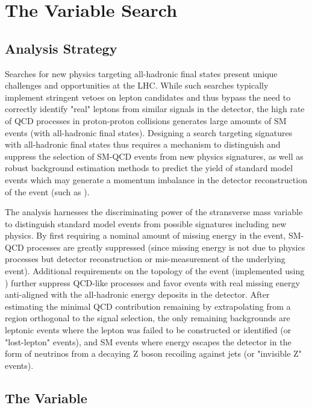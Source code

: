 \chapter{The \mttwo Variable Search}
\label{ch:analysis}

\section{Analysis Strategy}
\label{sec:strategy}
Searches for new physics targeting all-hadronic final states present unique challenges and opportunities at the LHC. While such searches typically implement stringent vetoes on lepton candidates and thus bypass the need to correctly identify "real" leptons from similar signals in the detector, the high rate of QCD processes in proton-proton collisions generates large amounts of SM events (with all-hadronic final states). Designing a search targeting signatures with all-hadronic final states thus requires a mechanism to distinguish and suppress the selection of SM-QCD events from new physics signatures, as well as robust background estimation methods to predict the yield of standard model events which may generate a momentum imbalance in the detector reconstruction of the event (such as \znunu).

The \mttwo analysis harnesses the discriminating power of the \mttwo stransverse mass variable to distinguish standard model events from possible signatures including new physics. By first requiring a nominal amount of missing energy in the event, SM-QCD processes are greatly suppressed (since missing energy is not due to physics processes but detector reconstruction or mis-measurement of the underlying event). Additional requirements on the topology of the event (implemented using \mttwo) further suppress QCD-like processes and favor events with real missing energy anti-aligned with the all-hadronic energy deposits in the detector. After estimating the minimal QCD contribution remaining by extrapolating from a region orthogonal to the signal selection, the only remaining backgrounds are leptonic events where the lepton was failed to be constructed or identified (or "lost-lepton" events), and SM events where energy escapes the detector in the form of neutrinos from a decaying Z boson recoiling against jets (or "invisible Z" events).

\section{The \mttwo Variable}
\label{sec:mt2}

